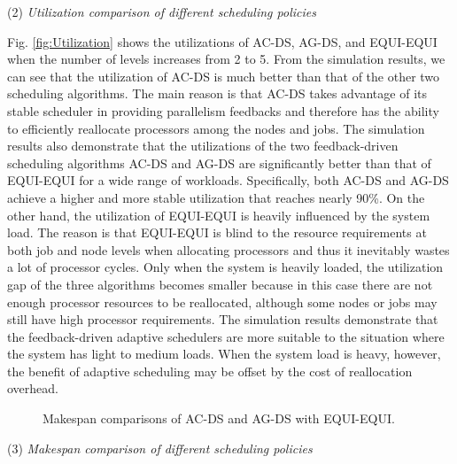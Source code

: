 \documentclass[10pt, a4paper]{article}
\begin{document}
\indent(2) \emph{Utilization comparison of different scheduling policies}

Fig. \ref{fig:Utilization} shows the utilizations of AC-DS, AG-DS, and EQUI-EQUI when the number of
levels increases from 2 to 5. From the simulation results, we can see that the utilization of AC-DS
is much better than that of the other two scheduling algorithms. The main reason is that AC-DS
takes advantage of its stable scheduler in providing parallelism feedbacks and therefore has the
ability to efficiently reallocate processors among the nodes and jobs. The simulation results also
demonstrate that the utilizations of the two feedback-driven scheduling algorithms AC-DS and AG-DS
are significantly better than that of EQUI-EQUI for a wide range of workloads. Specifically, both
AC-DS and AG-DS achieve a higher and more stable utilization that reaches nearly 90\%. On the other
hand, the utilization of EQUI-EQUI is heavily influenced by the system load. The reason is that
EQUI-EQUI is blind to the resource requirements at both job and node levels when allocating
processors and thus it inevitably wastes a lot of processor cycles. Only when the system is heavily
loaded, the utilization gap of the three algorithms becomes smaller because in this case there are
not enough processor resources to be reallocated, although some nodes or jobs may still have high
processor requirements. The simulation results demonstrate that the feedback-driven adaptive
schedulers are more suitable to the situation where the system has light to medium loads. When the
system load is heavy, however, the benefit of adaptive scheduling may be offset by the cost of
reallocation overhead.

\begin{figure*}[t]
\centering

    \caption{Makespan comparisons of AC-DS and AG-DS with EQUI-EQUI.}
    \label{fig:Comparison}
\end{figure*}

\indent(3) \emph{Makespan comparison of different scheduling policies}
\end{document}
